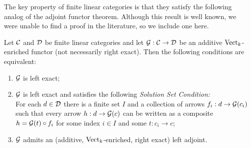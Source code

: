 \documentclass[a4paper]{amsart}
\begin{document}
The key property of finite linear categories is that they satisfy the following analog of the adjoint functor theorem.  Although this result is well known, we were unable to find a proof in the literature, so we include one here.

\begin{proposition} \label{prop:AFT}
	Let $\mathcal C$ and $\mathcal D$ be finite linear categories and let $\mathcal G: \mathcal C \rightarrow \mathcal D$  be an additive $\mathrm{Vect}_k$-enriched functor (not necessarily right exact). Then the following conditions are equivalent: 
	\begin{enumerate}
		\item $\mathcal G$ is left exact;  
		\item $\mathcal G$ is left exact and satisfies the following {\em Solution Set Condition:} \\  For each $d \in \mathcal D$ there is a finite set $I$ and a collection of arrows $f_i:d \to \mathcal G(c_i)$ such that every arrow $h:d \to \mathcal G(c)$ can be written as a composite $h = \mathcal G(t) \circ f_i$ for some index $i \in I$ and some $t: c_i \to c$; 
		\item $\mathcal G$ admits an (additive, ${\mathrm{Vect}_k}$-enriched, right exact) left adjoint.
	\end{enumerate}
\end{proposition}
\end{document}
